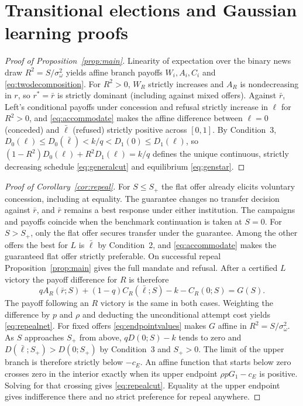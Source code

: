 \documentclass[11pt,letterpaper]{article}
\begin{document}
\section{Transitional elections and Gaussian learning proofs}\label{app:gaussian}

\begin{proof}[Proof of Proposition~\ref{prop:main}]
Linearity of expectation over the binary news draw $R^2=S/\sigma_\omega^2$ yields affine branch payoffs $W_i,A_i,C_i$ and \eqref{eq:twodecomposition}. For $R^2>0$, $W_R$ strictly increases and $A_R$ is nondecreasing in $r$, so $r^*=\bar r$ is strictly dominant (including against mixed offers). Against $\bar r$, Left's conditional payoffs under concession and refusal strictly increase in $\ell$ for $R^2>0$, and \eqref{eq:accommodate} makes the affine difference between $\ell=0$ (conceded) and $\bar\ell$ (refused) strictly positive across $[0,1]$. By Condition~3, $D_0(\ell)\le D_0(\bar\ell)<k/q<D_1(0)\le D_1(\ell)$, so $(1-R^2)D_0(\ell)+R^2 D_1(\ell)=k/q$ defines the unique continuous, strictly decreasing schedule \eqref{eq:generalcut} and equilibrium \eqref{eq:genstar}.
\end{proof}

\begin{proof}[Proof of Corollary~\ref{cor:repeal}]
For $S\le S_+$ the flat offer already elicits voluntary concession, including at equality. The guarantee changes no transfer decision against $\bar r$, and $\bar r$ remains a best response under either institution. The campaigns and payoffs coincide when the benchmark continuation is taken at $S=0$. For $S>S_+$, only the flat offer secures transfer under the guarantee. Among the other offers the best for $L$ is $\bar\ell$ by Condition~2, and \eqref{eq:accommodate} makes the guaranteed flat offer strictly preferable. On successful repeal Proposition~\ref{prop:main} gives the full mandate and refusal. After a certified $L$ victory the payoff difference for $R$ is therefore
\[
 qA_R(\bar r;S)+(1-q)C_R(\bar\ell;S)-k-C_R(0;S)=G(S).
\]
The payoff following an $R$ victory is the same in both cases. Weighting the difference by $p$ and $\rho$ and deducting the unconditional attempt cost yields \eqref{eq:repealnet}. For fixed offers \eqref{eq:endpointvalues} makes $G$ affine in $R^2=S/\sigma_\omega^2$. As $S$ approaches $S_+$ from above, $qD(0;S)-k$ tends to zero and $D(\bar\ell;S_+)>D(0;S_+)$ by Condition~3 and $S_+>0$. The limit of the upper branch is therefore strictly below $-c_E$. An affine function that starts below zero crosses zero in the interior exactly when its upper endpoint $\rho p G_1-c_E$ is positive. Solving for that crossing gives \eqref{eq:repealcut}. Equality at the upper endpoint gives indifference there and no strict preference for repeal anywhere.
\end{proof}
\end{document}

